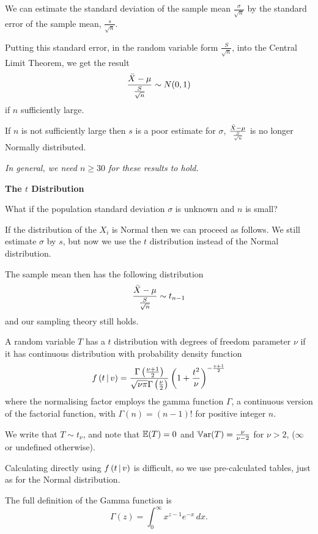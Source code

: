 \documentclass[10pt, a4paper]{article}
\begin{document}
We can estimate the standard deviation of the sample mean $\frac{\sigma}{\sqrt{n}}$ by the standard error of the sample mean,
$\frac{s}{\sqrt{n}}$.

Putting this standard error,
in the random variable form $\frac{S}{\sqrt{n}}$,
into the Central Limit Theorem,
we get the result
\[
\frac{\Bar{X} - \mu}{\frac{S}{\sqrt{n}}} \sim N(0, 1)
\]
if $n$ sufficiently large.

If $n$ is not sufficiently large then $s$ is a poor estimate for $\sigma$,
$\frac{\Bar{X} - \mu}{\frac{S}{\sqrt{n}}}$ is no longer Normally distributed.

\textit{In general,
we need $n \geq 30$ for these results to hold.}

\textbf{The $t$ Distribution}

What if the population standard deviation $\sigma$ is unknown and $n$ is small?

If the distribution of the $X_i$ is Normal then we can proceed as follows.
We still estimate $\sigma$ by $s$,
but now we use the $t$ distribution instead of the Normal distribution.

The sample mean then has the following distribution
\[
\frac{\Bar{X} - \mu}{\frac{S}{\sqrt{n}}} \sim t_{n - 1}
\]
and our sampling theory still holds.

\begin{definition}
    A random variable $T$ has a $t$ distribution with degrees of freedom parameter $\nu$ if it has continuous distribution with probability density function
    \[
    f\left(t\,\middle|\, v\right) = \frac{\Gamma\left(\frac{\nu + 1}{2}\right)}{\sqrt{\nu\pi}\Gamma\left(\frac{\nu}{2}\right)}\left(1 + \frac{t ^ 2}{\nu}\right) ^ {-\frac{v + 1}{2}}
    \]
    where the normalising factor employs the gamma function $\Gamma$,
    a continuous version of the factorial function,
    with $\Gamma(n) = (n - 1)!$ for positive integer $n$.
\end{definition}

We write that $T \sim t_{\nu}$,
and note that $\mathbb{E}(T) = 0$ and $\mathbb{V}\mathrm{ar}(T) = \frac{\nu}{\nu - 2}$ for $\nu > 2$,
($\infty$ or undefined otherwise).

Calculating directly using $f\left(t\,\middle|\, v\right)$ is difficult,
so we use pre-calculated tables,
just as for the Normal distribution.

The full definition of the Gamma function is
\[
\Gamma(z) = \int_{0}^{\infty}x ^ {z - 1}e ^ {-x}\,dx.
\]
\end{document}

